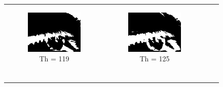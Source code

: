 \begin{figure}[htbp]
\begin{tabular}{cccc}
\begin{subfigure}{0.2\linewidth}
    \includegraphics[width=\linewidth]{plots/thresholding/th10}
    \caption{Th = 119}
    \end{subfigure} &
    \begin{subfigure}{0.2\linewidth}
    \centering
    \includegraphics[width=\linewidth]{plots/thresholding/th11}
    \caption{Th = 125}
    \end{subfigure} \\
    \begin{subfigure}{0.2\linewidth}
    \centering

\end{subfigure}
\end{tabular}
\end{figure}
